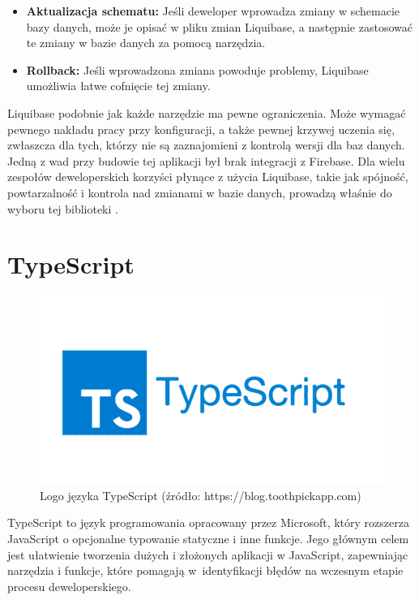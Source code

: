 \begin{itemize}
\item \textbf{Aktualizacja schematu:} Jeśli deweloper wprowadza zmiany w schemacie bazy danych, może je opisać w pliku zmian Liquibase, a następnie zastosować te zmiany w bazie danych za pomocą narzędzia.

\item \textbf{Rollback:} Jeśli wprowadzona zmiana powoduje problemy, Liquibase umożliwia łatwe cofnięcie tej zmiany.
\end{itemize}
Liquibase podobnie jak każde narzędzie ma pewne ograniczenia. Może wymagać pewnego nakładu pracy przy konfiguracji, a także pewnej krzywej uczenia się, zwłaszcza dla tych, którzy nie są zaznajomieni z kontrolą wersji dla baz danych. Jedną z wad przy budowie tej aplikacji był brak integracji z Firebase. Dla wielu zespołów deweloperskich korzyści płynące z użycia Liquibase, takie jak spójność, powtarzalność i kontrola nad zmianami w bazie danych, prowadzą właśnie do wyboru tej biblioteki \cite{liquibaseSpecs}.

\section{TypeScript}
\begin{figure}[h]
    \centering
    \includegraphics[width=0.5\linewidth]{./img/typescript.png}
    \caption{Logo języka TypeScript (źródło: https://blog.toothpickapp.com)}
    \label{fig:TypeScript}
\end{figure}
TypeScript to język programowania opracowany przez Microsoft, który rozszerza JavaScript o opcjonalne typowanie statyczne i inne funkcje. Jego głównym celem jest ułatwienie tworzenia dużych i złożonych aplikacji w JavaScript, zapewniając narzędzia i funkcje, które pomagają w~identyfikacji błędów na wczesnym etapie procesu deweloperskiego.

